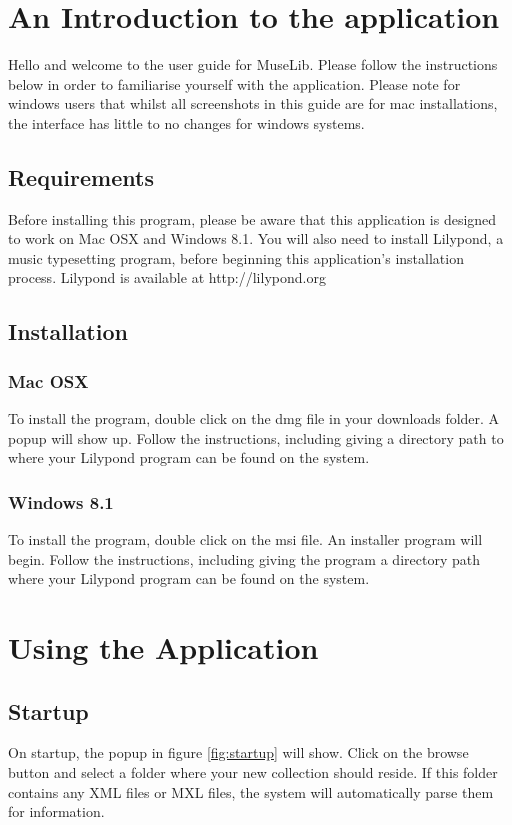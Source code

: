 \section{An Introduction to the application}
Hello and welcome to the user guide for MuseLib. Please follow the instructions below in order to familiarise yourself with the application. Please note for windows users that whilst all screenshots in this guide are for mac installations, the interface has little to no changes for windows systems.
\subsection{Requirements}
Before installing this program, please be aware that this application is designed to work on Mac OSX and Windows 8.1. You will also need to install Lilypond, a music typesetting program, before beginning this application's installation process. Lilypond is available at http://lilypond.org

\subsection{Installation}
\subsubsection{Mac OSX}
To install the program, double click on the dmg file in your downloads folder. A popup will show up. Follow the instructions, including giving a directory path to where your Lilypond program can be found on the system.

\subsubsection{Windows 8.1}
To install the program, double click on the msi file. An installer program will begin. Follow the instructions, including giving the program a directory path where your Lilypond program can be found on the system.

\section{Using the Application}
\subsection{Startup}
On startup, the popup in figure \ref{fig:startup} will show. Click on the browse button and select a folder where your new collection should reside. If this folder contains any XML files or MXL files, the system will automatically parse them for information.

